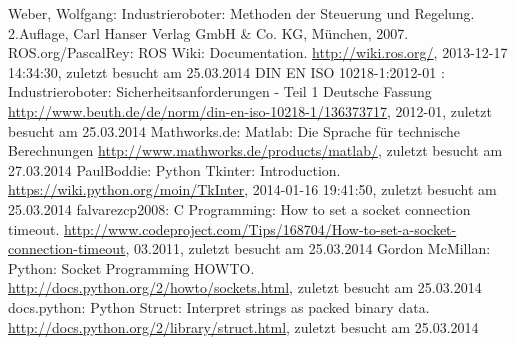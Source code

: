 \begin{thebibliography}{XXXXXX-JJJJa}



\renewcommand{\bibname}{A. ~Literaturverzeichnis}
\setcounter{chapter}{1}



 Weber, Wolfgang: Industrieroboter: Methoden der Steuerung und Regelung. 2.Auflage, Carl Hanser Verlag GmbH \& Co. KG, München, 2007.
 ROS.org/PascalRey: ROS Wiki: Documentation. \url{http://wiki.ros.org/}, 2013-12-17 14:34:30, zuletzt besucht am 25.03.2014
 DIN EN ISO 10218-1:2012-01 : Industrieroboter: Sicherheitsanforderungen - Teil 1 Deutsche Fassung \url{http://www.beuth.de/de/norm/din-en-iso-10218-1/136373717}, 2012-01, zuletzt besucht am 25.03.2014
 Mathworks.de: Matlab: Die Sprache für technische Berechnungen \url{http://www.mathworks.de/products/matlab/}, zuletzt besucht am 27.03.2014
 PaulBoddie: Python Tkinter: Introduction. \url{https://wiki.python.org/moin/TkInter}, 2014-01-16 19:41:50, zuletzt besucht am 25.03.2014
 falvarezcp2008: C Programming: How to set a socket connection timeout. \url{http://www.codeproject.com/Tips/168704/How-to-set-a-socket-connection-timeout},  03.2011, zuletzt besucht am 25.03.2014
 Gordon McMillan: Python: Socket Programming HOWTO. \url{http://docs.python.org/2/howto/sockets.html}, zuletzt besucht am 25.03.2014
 docs.python: Python Struct: Interpret strings as packed binary data. \url{http://docs.python.org/2/library/struct.html}, zuletzt besucht am 25.03.2014


\end{thebibliography}
